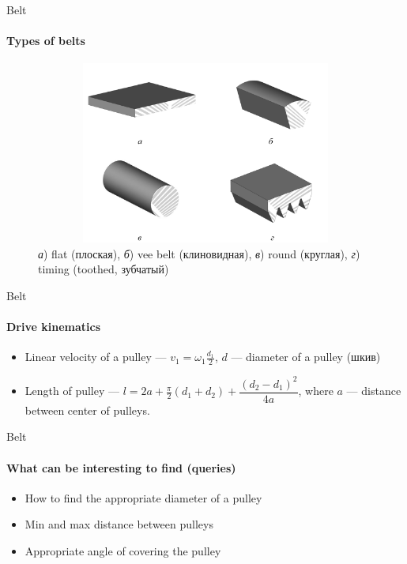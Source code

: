 \documentclass[aspectratio=169]{beamer}
\begin{document}
\begin{frame}[t]{Belt}
    \framesubtitle{Types of belts}
    \vspace{-1.2cm}
    \begin{figure}[H]
        \centering\includegraphics[height=6cm,width=1\textwidth,keepaspectratio]{belt_types.png}
        \caption*{\textit{а}) flat (плоская), \textit{б}) vee belt (клиновидная), \textit{в}) round (круглая), \textit{г}) timing (toothed, зубчатый)}
        \label{fig:belt_types.png}
    \end{figure}

\end{frame}

\begin{frame}[t]{Belt}
    \framesubtitle{Drive kinematics}
    \begin{itemize}
        \item Linear velocity of a pulley --- $v_1=\omega_1 \frac{d_1}{2}$, $d$ --- diameter of a pulley (шкив)
        \item Length of pulley --- $l = 2a + \frac{\pi}{2}(d_1 + d_2) + \dfrac{(d_2-d_1)^2}{4a}$, where $a$ --- distance between center of pulleys.
    \end{itemize}
\end{frame}


\begin{frame}[t]{Belt}
    \framesubtitle{What can be interesting to find (queries)}
    \begin{itemize}
        \item How to find the appropriate diameter of a pulley
        \item Min and max distance between pulleys
        \item Appropriate angle of covering the pulley
    \end{itemize}
\end{frame}
\end{document}
